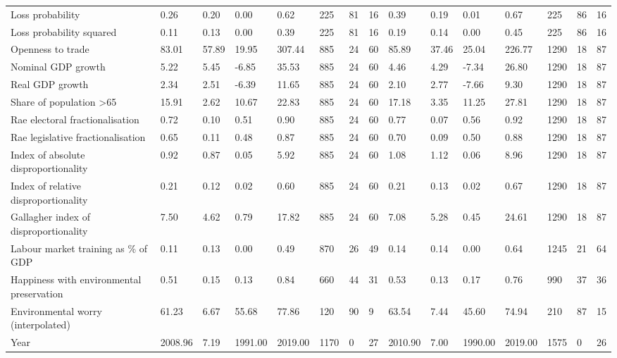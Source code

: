 \begin{longtable}{lllllllllllllll}
\addlinespace
Loss probability & 0.26 & 0.20 & 0.00 & 0.62 & 225 & 81 & 16 & 0.39 & 0.19 & 0.01 & 0.67 & 225 & 86 & 16\\
Loss probability squared & 0.11 & 0.13 & 0.00 & 0.39 & 225 & 81 & 16 & 0.19 & 0.14 & 0.00 & 0.45 & 225 & 86 & 16\\
Openness to trade & 83.01 & 57.89 & 19.95 & 307.44 & 885 & 24 & 60 & 85.89 & 37.46 & 25.04 & 226.77 & 1290 & 18 & 87\\
Nominal GDP growth & 5.22 & 5.45 & -6.85 & 35.53 & 885 & 24 & 60 & 4.46 & 4.29 & -7.34 & 26.80 & 1290 & 18 & 87\\
Real GDP growth & 2.34 & 2.51 & -6.39 & 11.65 & 885 & 24 & 60 & 2.10 & 2.77 & -7.66 & 9.30 & 1290 & 18 & 87\\
\addlinespace
Share of population >65 & 15.91 & 2.62 & 10.67 & 22.83 & 885 & 24 & 60 & 17.18 & 3.35 & 11.25 & 27.81 & 1290 & 18 & 87\\
Rae electoral fractionalisation & 0.72 & 0.10 & 0.51 & 0.90 & 885 & 24 & 60 & 0.77 & 0.07 & 0.56 & 0.92 & 1290 & 18 & 87\\
Rae legislative fractionalisation & 0.65 & 0.11 & 0.48 & 0.87 & 885 & 24 & 60 & 0.70 & 0.09 & 0.50 & 0.88 & 1290 & 18 & 87\\
Index of absolute disproportionality & 0.92 & 0.87 & 0.05 & 5.92 & 885 & 24 & 60 & 1.08 & 1.12 & 0.06 & 8.96 & 1290 & 18 & 87\\
Index of relative disproportionality & 0.21 & 0.12 & 0.02 & 0.60 & 885 & 24 & 60 & 0.21 & 0.13 & 0.02 & 0.67 & 1290 & 18 & 87\\
\addlinespace
Gallagher index of disproportionality & 7.50 & 4.62 & 0.79 & 17.82 & 885 & 24 & 60 & 7.08 & 5.28 & 0.45 & 24.61 & 1290 & 18 & 87\\
Labour market training as \% of GDP & 0.11 & 0.13 & 0.00 & 0.49 & 870 & 26 & 49 & 0.14 & 0.14 & 0.00 & 0.64 & 1245 & 21 & 64\\
Happiness with environmental preservation & 0.51 & 0.15 & 0.13 & 0.84 & 660 & 44 & 31 & 0.53 & 0.13 & 0.17 & 0.76 & 990 & 37 & 36\\
Environmental worry (interpolated) & 61.23 & 6.67 & 55.68 & 77.86 & 120 & 90 & 9 & 63.54 & 7.44 & 45.60 & 74.94 & 210 & 87 & 15\\
Year & 2008.96 & 7.19 & 1991.00 & 2019.00 & 1170 & 0 & 27 & 2010.90 & 7.00 & 1990.00 & 2019.00 & 1575 & 0 & 26\\
\bottomrule
\end{longtable}
